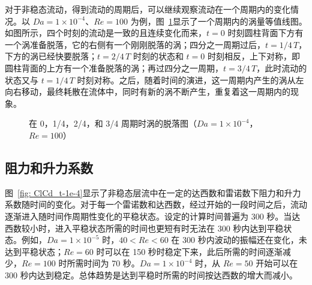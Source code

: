 对于非稳态流动，得到流动的周期后，可以继续观察流动在一个周期内的变化情况。以 $Da=1\times 10^{-4}$、$Re=100$ 为例，图~\ref{fig: 4*vortex}显示了一个周期内的涡量等值线图。如图所示，四个时刻的流动是一致的且连续变化而来，$t=0$ 时刻圆柱背面下方有一个涡准备脱落，它的右侧有一个刚刚脱落的涡；四分之一周期过后，$t=1/4\,T$，下方的涡已经快要脱落；$t=2/4\,T$ 时刻的状态和 $t=0$ 时刻相反，上下对称，即圆柱背面的上方有一个准备脱落的涡；再过四分之一周期，$t=3/4\,T$，此时流动的状态又与 $t=1/4\,T$ 时刻对称。之后，随着时间的演进，这一周期内产生的涡从左向右移动，最终耗散在流体中，同时有新的涡不断产生，重复着这一周期内的现象。

\begin{figure}
	\centering
	\begin{minipage}{\textwidth}
		\centering
	\end{minipage}
	\centering
	\begin{minipage}{\textwidth}
		\centering
	\end{minipage}
	\caption{在 0，1/4，2/4，和 3/4 周期时涡的脱落图（$Da=1\times 10^{-4}$，$Re=100$）}
	\label{fig: 4*vortex}
\end{figure}

\subsection{阻力和升力系数}

图~\ref{fig: ClCd_t-1e-4}显示了非稳态层流中在一定的达西数和雷诺数下阻力和升力系数随时间的变化。对于每一个雷诺数和达西数，经过开始的一段时间之后，流动逐渐进入随时间作周期性变化的平稳状态。设定的计算时间普遍为 300 秒。当达西数较小时，进入平稳状态所需的时间也更短有时无法在 300 秒内达到平稳状态。例如，$Da=1\times 10^{-5}$ 时，$40<Re<60$ 在 300 秒内波动的振幅还在变化，未达到平稳状态；$Re=60$ 时可以在 150 秒时稳定下来，此后所需的时间逐渐减少，$Re=100$ 时所需时间为 70 秒。$Da=1\times 10^{-4}$ 时，从 $Re=50$ 开始可以在 300 秒内达到稳定。总体趋势是达到平稳时所需的时间按达西数的增大而减小。

